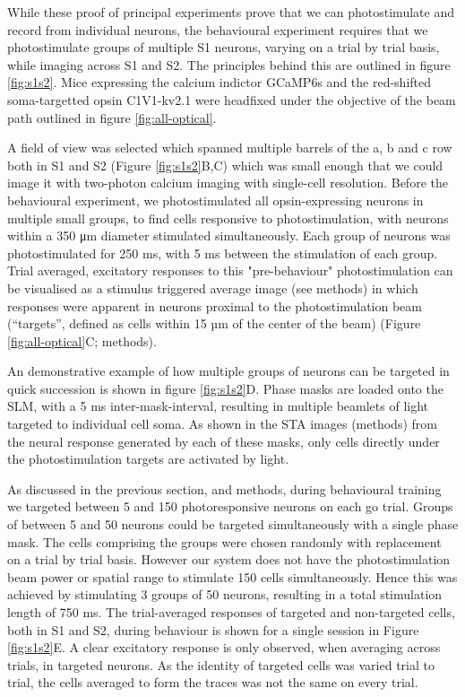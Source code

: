 While these proof of principal experiments prove that we can photostimulate and record from individual neurons, the behavioural experiment requires that we photostimulate groups of multiple S1 neurons, varying on a trial by trial basis, while imaging across S1 and S2. The principles behind this are outlined in figure \ref{fig:s1s2}. Mice expressing the calcium indictor GCaMP6s \cite{chen_ultrasensitive_2013} and the red-shifted soma-targetted opsin C1V1-kv2.1 \cite{yizhar_neocortical_2011, chettih_single-neuron_2019} were headfixed under the objective of the beam path outlined in figure \ref{fig:all-optical}. 

A field of view was selected which spanned multiple barrels of the a, b and c row both in S1 and S2 (Figure \ref{fig:s1s2}B,C) which was small enough that we could image it with two-photon calcium imaging with single-cell resolution. Before the behavioural experiment, we photostimulated all opsin-expressing neurons in multiple small groups, to find cells responsive to photostimulation, with neurons within a 350 μm diameter stimulated simultaneously. Each group of neurons was photostimulated for 250 ms, with 5 ms between the stimulation of each group. Trial averaged, excitatory responses to this "pre-behaviour" photostimulation can be visualised as a stimulus triggered average image (see methods) in which responses were apparent in neurons proximal to the photostimulation beam (“targets”, defined as cells within 15 µm of the center of the beam) (Figure \ref{fig:all-optical}C; methods).

An demonstrative example of how multiple groups of neurons can be targeted in quick succession is shown in figure \ref{fig:s1s2}D. Phase masks are loaded onto the SLM, with a 5 ms inter-mask-interval, resulting in multiple beamlets of light targeted to individual cell soma. As shown in the STA images (methods) from the neural response generated by each of these masks, only cells directly under the photostimulation targets are activated by light. 

As discussed in the previous section, and methods, during behavioural training we targeted between 5 and 150 photoresponsive neurons on each go trial. Groups of between 5 and 50 neurons could be targeted simultaneously with a single phase mask. The cells comprising the groups were chosen randomly with replacement on a trial by trial basis. However our system does not have the photostimulation beam power or spatial range to stimulate 150 cells simultaneously. Hence this was achieved by stimulating 3 groups of 50 neurons, resulting in a total stimulation length of 750 ms. The trial-averaged responses of targeted and non-targeted cells, both in S1 and S2, during behaviour is shown for a single session in Figure \ref{fig:s1s2}E. A clear excitatory response is only observed, when averaging across trials, in targeted neurons. As the identity of targeted cells was varied trial to trial, the cells averaged to form the traces was not the same on every trial.


